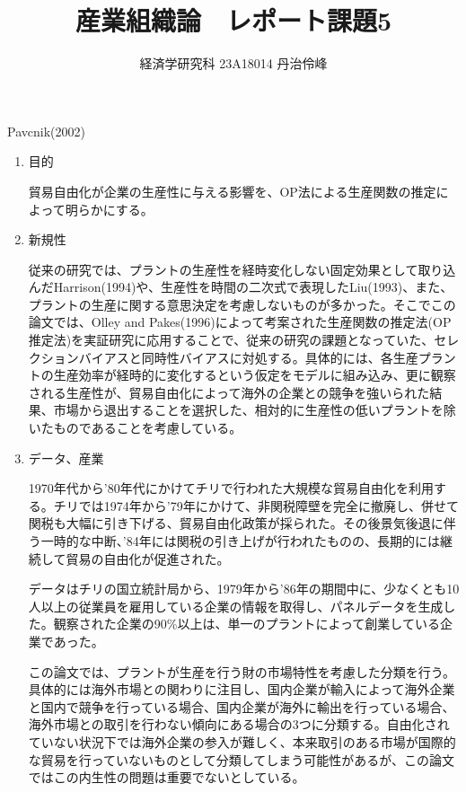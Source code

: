\documentclass{jsarticle}
\begin{document}
\title{産業組織論　レポート課題5}
\author{経済学研究科 23A18014 丹治伶峰}
\date{}
\maketitle

Pavcnik(2002)

\begin{enumerate}

\item 目的

貿易自由化が企業の生産性に与える影響を、OP法による生産関数の推定によって明らかにする。

\item 新規性

従来の研究では、プラントの生産性を経時変化しない固定効果として取り込んだHarrison(1994)や、生産性を時間の二次式で表現したLiu(1993)、また、プラントの生産に関する意思決定を考慮しないものが多かった。そこでこの論文では、Olley and Pakes(1996)によって考案された生産関数の推定法(OP推定法)を実証研究に応用することで、従来の研究の課題となっていた、セレクションバイアスと同時性バイアスに対処する。具体的には、各生産プラントの生産効率が経時的に変化するという仮定をモデルに組み込み、更に観察される生産性が、貿易自由化によって海外の企業との競争を強いられた結果、市場から退出することを選択した、相対的に生産性の低いプラントを除いたものであることを考慮している。

\item データ、産業

1970年代から'80年代にかけてチリで行われた大規模な貿易自由化を利用する。チリでは1974年から'79年にかけて、非関税障壁を完全に撤廃し、併せて関税も大幅に引き下げる、貿易自由化政策が採られた。その後景気後退に伴う一時的な中断、'84年には関税の引き上げが行われたものの、長期的には継続して貿易の自由化が促進された。

データはチリの国立統計局から、1979年から'86年の期間中に、少なくとも10人以上の従業員を雇用している企業の情報を取得し、パネルデータを生成した。観察された企業の90\%以上は、単一のプラントによって創業している企業であった。

この論文では、プラントが生産を行う財の市場特性を考慮した分類を行う。具体的には海外市場との関わりに注目し、国内企業が輸入によって海外企業と国内で競争を行っている場合、国内企業が海外に輸出を行っている場合、海外市場との取引を行わない傾向にある場合の3つに分類する。自由化されていない状況下では海外企業の参入が難しく、本来取引のある市場が国際的な貿易を行っていないものとして分類してしまう可能性があるが、この論文ではこの内生性の問題は重要でないとしている。


\end{enumerate}
\end{document}
